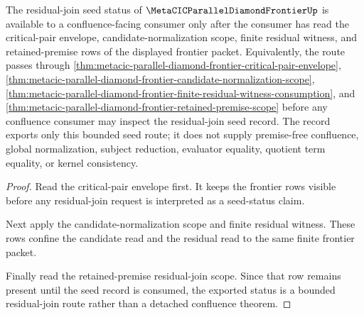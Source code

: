 \begin{theorem}
\label{thm:metacic-parallel-diamond-frontier-residual-join-seed-status}
The residual-join seed status of $\MetaCICParallelDiamondFrontierUp$ is available to a confluence-facing consumer only after the consumer has read the critical-pair envelope, candidate-normalization scope, finite residual witness, and retained-premise rows of the displayed frontier packet. Equivalently, the route passes through \autoref{thm:metacic-parallel-diamond-frontier-critical-pair-envelope}, \autoref{thm:metacic-parallel-diamond-frontier-candidate-normalization-scope}, \autoref{thm:metacic-parallel-diamond-frontier-finite-residual-witness-consumption}, and \autoref{thm:metacic-parallel-diamond-frontier-retained-premise-scope} before any confluence consumer may inspect the residual-join seed record. The record exports only this bounded seed route; it does not supply premise-free confluence, global normalization, subject reduction, evaluator equality, quotient term equality, or kernel consistency.
\end{theorem}
\begin{proof}
Read the critical-pair envelope first. It keeps the frontier rows visible before any residual-join request is interpreted as a seed-status claim.

Next apply the candidate-normalization scope and finite residual witness. These rows confine the candidate read and the residual read to the same finite frontier packet.

Finally read the retained-premise residual-join scope. Since that row remains present until the seed record is consumed, the exported status is a bounded residual-join route rather than a detached confluence theorem.
\end{proof}
